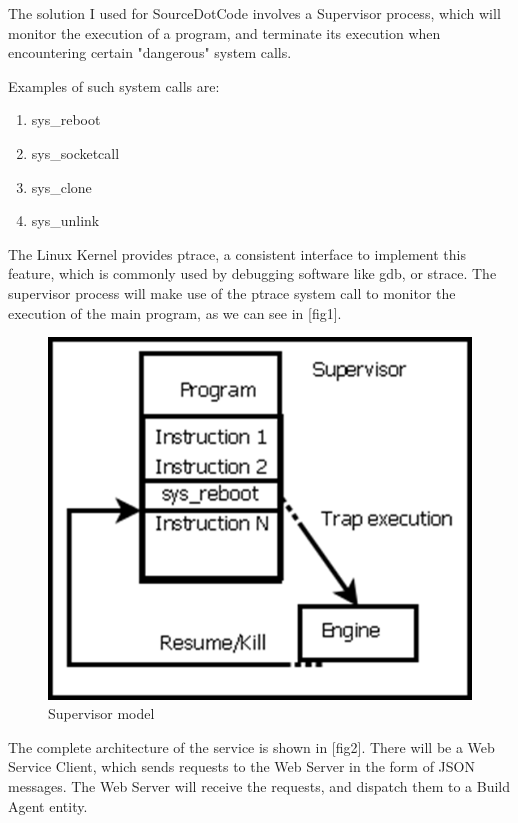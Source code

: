 
The solution I used for SourceDotCode involves a Supervisor process, which will monitor the execution of a program, and terminate its execution when encountering certain "dangerous" system calls.

Examples of such system calls are:
\begin{enumerate}
\item{sys_reboot}
\item{sys_socketcall}
\item{sys_clone}
\item{sys_unlink}
\end{enumerate}

The Linux Kernel provides ptrace, a consistent interface to implement this feature, which is commonly used by debugging software like gdb, or strace.
The supervisor process will make use of the ptrace system call to monitor the execution of the main program, as we can see in [fig1].

\begin{figure}
\begin{center}
\includegraphics[scale=0.5]{pics/superv.png}
\caption{Supervisor model}
\end{center}
\label{fig1:superv}
\end{figure}

The complete architecture of the service is shown in [fig2].
There will be a Web Service Client, which sends requests to the Web Server in the form of JSON messages.
The Web Server will receive the requests, and dispatch them to a Build Agent entity.

